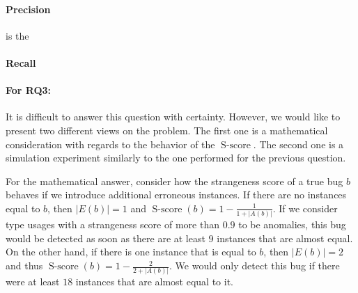 \paragraph{Precision} is the 
\paragraph{Recall}



\paragraph{For RQ3:}

It is difficult to answer this question with certainty.
However, we would like to present two different views on the problem.
The first one is a mathematical consideration with regards to the behavior of the $\operatorname{S-score}$.
The second one is a simulation experiment similarly to the one performed for the previous question.

For the mathematical answer, consider how the strangeness score of a true bug $b$ behaves if we introduce additional erroneous instances.
If there are no instances equal to $b$, then $|E(b)|=1$ and $\operatorname{S-score}(b)=1-\frac{1}{1+|A(b)|}$.
If we consider type usages with a strangeness score of more than $0.9$ to be anomalies, this bug would be detected as soon as there are at least $9$ instances that are almost equal.
On the other hand, if there is one instance that is equal to $b$, then $|E(b)|=2$ and thus $\operatorname{S-score}(b)=1-\frac{2}{2+|A(b)|}$.
We would only detect this bug if there were at least $18$ instances that are almost equal to it.

